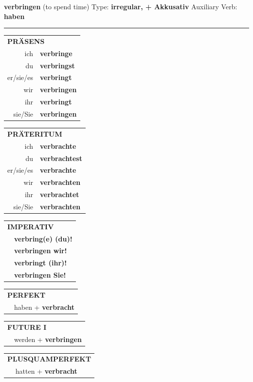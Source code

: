 \documentclass[10pt,a4paper]{revtex4-2}
\begin{document}
\begin{verbbox-acc}
{\Large \bf verbringen} (to spend time) \hfill Type: \textbf{irregular, + Akkusativ} \hfill Auxiliary Verb: \textbf{haben}

\vspace{5pt}
\hrule
\vspace{5pt}

\begin{tabular}{rl}
\multicolumn{2}{l}{\textbf{PRÄSENS}}\\
ich & \textbf{verbringe}\\
du & \textbf{verbringst}\\
er/sie/es & \textbf{verbringt}\\
wir & \textbf{verbringen}\\
ihr & \textbf{verbringt}\\
sie/Sie & \textbf{verbringen}\\
\end{tabular}
\hfill
\begin{tabular}{rl}
\multicolumn{2}{l}{\textbf{PRÄTERITUM}}\\
ich & \textbf{verbrachte}\\
du & \textbf{verbrachtest}\\
er/sie/es & \textbf{verbrachte}\\
wir & \textbf{verbrachten}\\
ihr & \textbf{verbrachtet}\\
sie/Sie & \textbf{verbrachten}\\
\end{tabular}
\hfill
\begin{tabular}{rl}
\multicolumn{2}{l}{\textbf{IMPERATIV}}\\
& \textbf{verbring(e) (du)!}\\
& \textbf{verbringen wir!}\\
& \textbf{verbringt (ihr)!}\\
& \textbf{verbringen Sie!}\\
\end{tabular}

\vspace{10pt}

\begin{tabular}{rl}
\multicolumn{2}{l}{\textbf{PERFEKT}}\\
& haben + \textbf{verbracht}\\
\end{tabular}
\hfill
\begin{tabular}{rl}
\multicolumn{2}{l}{\textbf{FUTURE I}}\\
& werden + \textbf{verbringen}\\
\end{tabular}
\hfill
\begin{tabular}{rl}
\multicolumn{2}{l}{\textbf{PLUSQUAMPERFEKT}}\\
& hatten + \textbf{verbracht}\\
\end{tabular}


\end{verbbox-acc}
\end{document}
